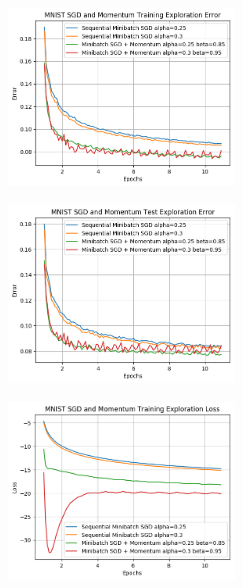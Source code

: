 \documentclass[10pt]{article}
\begin{document}
\begin{multicols}{2}
\begin{center}
    \includegraphics[width=0.45\textwidth]{SGDandMomentumTrainingExplorationError.png}
\end{center}
\begin{center}
    \includegraphics[width=0.45\textwidth]{SGDandMomentumTestExplorationError.png}
\end{center}
\begin{center}
    \includegraphics[width=0.45\textwidth]{SGDandMomentumTrainingExplorationLoss.png}
\end{center}


\end{multicols}
\end{document}

